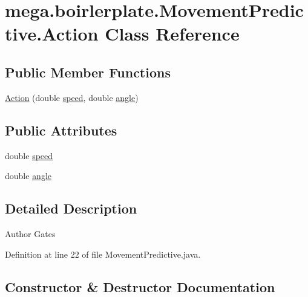 \hypertarget{classmega_1_1boirlerplate_1_1_movement_predictive_1_1_action}{}\section{mega.\+boirlerplate.\+Movement\+Predictive.\+Action Class Reference}
\label{classmega_1_1boirlerplate_1_1_movement_predictive_1_1_action}
\subsection*{Public Member Functions}
\begin{DoxyCompactItemize}
\item 
\hyperlink{classmega_1_1boirlerplate_1_1_movement_predictive_1_1_action_a70d0f10bba1cf7231441f4051fd34225}{Action} (double \hyperlink{classmega_1_1boirlerplate_1_1_movement_predictive_1_1_action_ad107aff2bd797bfa3991eb36e6a5ad83}{speed}, double \hyperlink{classmega_1_1boirlerplate_1_1_movement_predictive_1_1_action_a49ee0d6b4ec3a6fdf11c2a9ac5e88585}{angle})
\end{DoxyCompactItemize}
\subsection*{Public Attributes}
\begin{DoxyCompactItemize}
\item 
double \hyperlink{classmega_1_1boirlerplate_1_1_movement_predictive_1_1_action_ad107aff2bd797bfa3991eb36e6a5ad83}{speed}
\item 
double \hyperlink{classmega_1_1boirlerplate_1_1_movement_predictive_1_1_action_a49ee0d6b4ec3a6fdf11c2a9ac5e88585}{angle}
\end{DoxyCompactItemize}


\subsection{Detailed Description}
\begin{DoxyAuthor}{Author}
Gates 
\end{DoxyAuthor}


Definition at line 22 of file Movement\+Predictive.\+java.



\subsection{Constructor \& Destructor Documentation}
\mbox{\label{classmega_1_1boirlerplate_1_1_movement_predictive_1_1_action_a70d0f10bba1cf7231441f4051fd34225}} 

